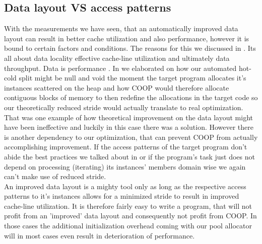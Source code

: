 \subsection{Data layout VS access patterns}
With the measurements we have seen, that an automatically improved data layout can result in better cache utilization and also performance, however it is bound to certain factors and conditions. The reasons for this we discussed in . Its all about data locality effective cache-line utilization and ultimately data throughput. Data is performance . In  we elaborated on how our automated hot-cold split might be null and void the moment the target program allocates it's instances scattered on the heap and how COOP would therefore allocate contiguous blocks of memory to then redefine the allocations in the target code so our theoretically reduced stride would actually translate to real optimization.\\
That was one example of how theoretical improvement on the data layout might have been ineffective and luckily in this case there was a solution. However there is another dependency to our optimization, that can prevent COOP from actually accomplishing improvement. If the access patterns of the target program don't abide the best practices we talked about in  or if the program's task just does not depend on processing (iterating) its instances' members domain wise we again can't make use of reduced stride.\\
An improved data layout is a mighty tool only as long as the respective access patterns to it's instances allows for a minimized stride to result in improved cache-line utilization. It is therefore fairly easy to write a program, that will not profit from an 'improved' data layout and consequently not profit from COOP. In those cases the additional initialization overhead coming with our pool allocator will in most cases even result in deterioration of performance.

